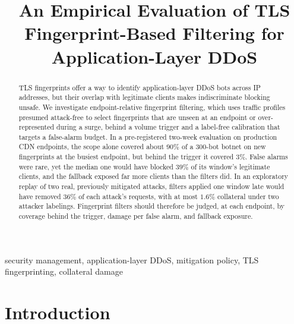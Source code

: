 \documentclass[conference,letterpaper,10pt]{IEEEtran}
\newcommand\1{\textit{(i)}}
\newcommand\2{\textit{(ii)}}
\newcommand\3{\textit{(iii)}}
\newcommand\4{\textit{(iv)}}
\newcommand\5{\textit{(v)}}
\newcommand\6{\textit{(vi)}}
\newcommand\7{\textit{(vii)}}
\newcommand\8{\textit{(viii)}}
\newcommand\9{\textit{(ix)}}
\begin{document}
\title{An Empirical Evaluation of TLS Fingerprint-Based Filtering for Application-Layer DDoS}

\author{
}

\maketitle

\begin{abstract}
TLS fingerprints offer a way to identify application-layer DDoS bots across IP addresses, but their overlap with legitimate clients makes indiscriminate blocking unsafe. We investigate endpoint-relative fingerprint filtering, which uses traffic profiles presumed attack-free to select fingerprints that are unseen at an endpoint or over-represented during a surge, behind a volume trigger and a label-free calibration that targets a false-alarm budget. In a pre-registered two-week evaluation on production CDN endpoints, the scope alone covered about $90\%$ of a 300-bot botnet on new fingerprints at the busiest endpoint, but behind the trigger it covered $3\%$. False alarms were rare, yet the median one would have blocked $39\%$ of its window's legitimate clients, and the fallback exposed far more clients than the filters did. In an exploratory replay of two real, previously mitigated attacks, filters applied one window late would have removed $36\%$ of each attack's requests, with at most $1.6\%$ collateral under two attacker labelings. Fingerprint filters should therefore be judged, at each endpoint, by coverage behind the trigger, damage per false alarm, and fallback exposure.
\end{abstract}


\begin{IEEEkeywords}
security management, application-layer DDoS, mitigation policy, TLS
fingerprinting, collateral damage
\end{IEEEkeywords}



\section{Introduction}
\label{sec:intro}
\end{document}
